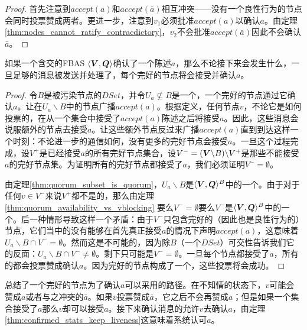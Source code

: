\begin{proof}
	首先注意到$accept(a)$和$accept(\bar a)$相互冲突——没有一个良性行为的节点会同时投票赞成两者。更进一步，注意到$v_1$必须批准$accept(a)$以确认$a$。由定理\ref{thm:nodes_cannot_ratify_contracdictory}，$v_2$不会批准$accept(\bar a)$因此不会确认$\bar a$。
\end{proof}

\begin{theorem}\label{thm:confirmed_stats_keep_liveness}
	如果一个含{\quorum}交的FBAS $\langle{\bm V},{\bm Q}\rangle$确认了一个陈述$a$，那么不论接下来会发生什么，一旦足够的消息被发送并处理了，每个完好的节点将会接受并确认$a$。
\end{theorem}

\begin{proof}
	令$B$是被污染节点的$DSet$，并令$U_a\not \subseteq B$是一个{\quorum}，一个完好的节点通过它确认$a$。让在$U_a\backslash B$中的节点广播$accept(a)$。根据定义，任何节点$v$，不论它是如何投票的，在从一个{\vblock}集合中接受了$accept(a)$陈述之后将接受$a$。因此，这些消息会说服额外的节点去接受$a$。让这些额外节点反过来广播$accept(a)$直到到达这样一个时刻：不论进一步的通信如何，没有更多的完好节点会接受$a$。一旦这个过程完成，设$V^+$是已经接受$a$的所有完好节点集合，设$V^-=({\bm V}\backslash B)\backslash V^+$是那些不能接受$a$的完好节点集。为证明所有的完好节点都接受了$a$，我们必须证明$V^-=\emptyset$。

	由定理\ref{thm:quorum_subset_is_quorum}，$U_a\backslash B$是$\langle{\bm V},{\bm Q}\rangle^{B}$中的一个{\quorum}。由于对于任何$v\in V^-$来说$V^+$都不是{\vblock}的，那么由定理\ref{thm:quorum_availability_vs_vblocking} 要么$V^-=\emptyset$要么$V^-$是$\langle{\bm V},{\bm Q}\rangle^{B}$中的一个{\quorum}。后一种情形导致这样一个矛盾：由于$V^-$只包含完好的（因此也是良性行为的）节点，它们当中的没有能够在首先真正接受$a$的情况下声明$accept(a)$，这意味着$U_a\backslash B\cap V^-=\emptyset$。然而这是不可能的，因为除$B$（一个$DSet$）{\quorum}可交性告诉我们它的反面：$U_a\backslash B\cap V^-\neq\emptyset$。剩下只可能是$V^-=\emptyset$。一旦每个节点都接受了$a$，所有的都会投票赞成确认$a$。因为完好的节点构成了一个{\quorum}，这些投票将会成功。
\end{proof}

总结了一个完好的节点为了确认$a$可以采用的路径。在不知情的状态下，$v$可能会赞成$a$或者与之冲突的$\bar a$。如果$v$投票赞成$\bar a$，它之后不会再赞成$a$；但是如果一个{\vblock}集合接受了$a$那么$v$却可以接受$a$。接下来确认消息的{\quorum}允许$v$去确认$a$，由定理\ref{thm:confirmed_stats_keep_liveness}这意味着系统认可$a$。